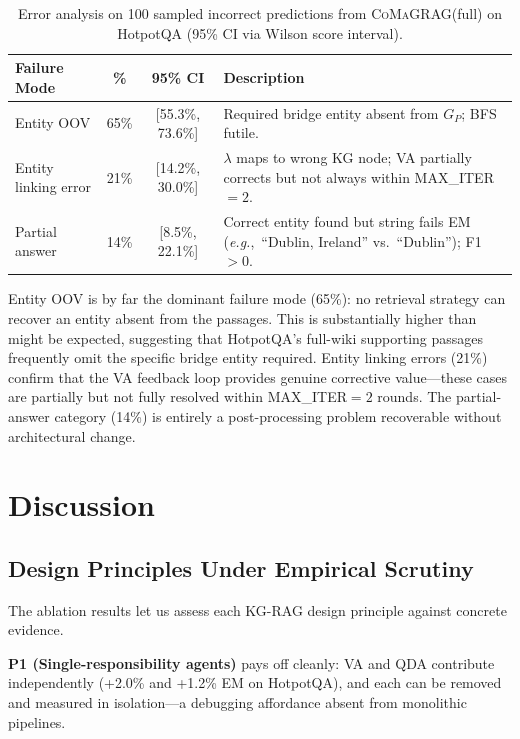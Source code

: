 \documentclass[runningheads]{llncs}
\newcommand{\sys}{\textsc{CoMaGRAG}\xspace}
\newcommand{\eg}{\emph{e.g.},\xspace}
\begin{document}
\begin{table}[t]
\centering
\caption{Error analysis on 100 sampled incorrect predictions from \sys (full)
on HotpotQA (95\% CI via Wilson score interval).}
\label{tab:errors}
\begin{tabular}{lccp{5.4cm}}
\toprule
Failure Mode & \% & 95\% CI & Description \\
\midrule
Entity OOV & 65\% & [55.3\%, 73.6\%] &
  Required bridge entity absent from $G_P$; BFS futile. \\
Entity linking error & 21\% & [14.2\%, 30.0\%] &
  $\lambda$ maps to wrong KG node; VA partially corrects
  but not always within MAX\_ITER$=2$. \\
Partial answer & 14\% & [8.5\%, 22.1\%] &
  Correct entity found but string fails EM
  (\eg\ ``Dublin, Ireland'' vs.\ ``Dublin''); F1~$>0$. \\
\bottomrule
\end{tabular}
\end{table}

Entity OOV is by far the dominant failure mode (65\%): no retrieval strategy
can recover an entity absent from the passages. This is substantially higher
than might be expected, suggesting that HotpotQA's full-wiki supporting
passages frequently omit the specific bridge entity required. Entity linking
errors (21\%) confirm that the VA feedback loop provides genuine corrective
value---these cases are partially but not fully resolved within
MAX\_ITER$=2$ rounds. The partial-answer category (14\%) is entirely a
post-processing problem recoverable without architectural change.

\section{Discussion}
\label{sec:discussion}

\subsection{Design Principles Under Empirical Scrutiny}

The ablation results let us assess each KG-RAG design principle against
concrete evidence.

\textbf{P1 (Single-responsibility agents)} pays off cleanly: VA and QDA
contribute independently (+2.0\% and +1.2\% EM on HotpotQA), and each can be
removed and measured in isolation---a debugging affordance absent from monolithic
pipelines.
\end{document}
